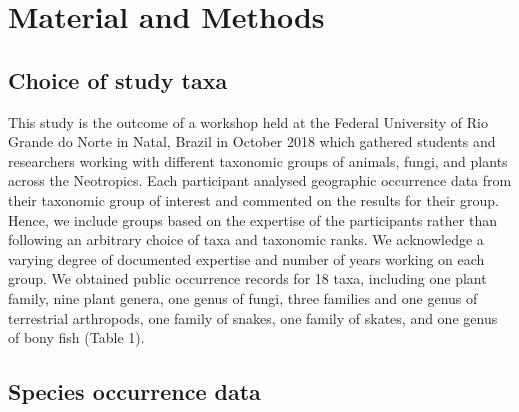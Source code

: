 \documentclass[fleqn,10pt,lineno]{wlpeerj} %
\begin{document}
\hypertarget{material-and-methods}{%
\section*{Material and Methods}\label{material-and-methods}}

\hypertarget{choice-of-study-taxa}{%
\subsection*{Choice of study taxa}\label{choice-of-study-taxa}}

This study is the outcome of a workshop held at the Federal University of Rio Grande do Norte in Natal, Brazil in October 2018 which gathered students and researchers working with different taxonomic groups of animals, fungi, and plants across the Neotropics. Each participant analysed geographic occurrence data from their taxonomic group of interest and commented on the results for their group. Hence, we include groups based on the expertise of the participants rather than following an arbitrary choice of taxa and taxonomic ranks. We acknowledge a varying degree of documented expertise and number of years working on each group. We obtained public occurrence records for 18 taxa, including one plant family, nine plant genera, one genus of fungi, three families and one genus of terrestrial arthropods, one family of snakes, one family of skates, and one genus of bony fish (Table 1).

\hypertarget{species-occurrence-data}{%
\subsection*{Species occurrence data}\label{species-occurrence-data}}
\end{document}
